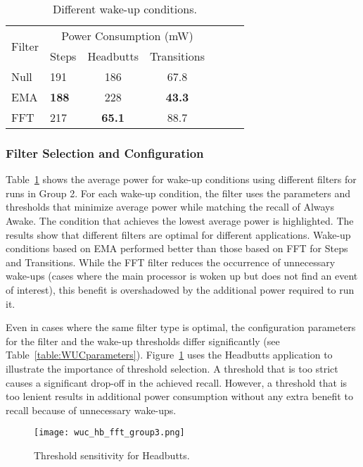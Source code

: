 \begin{table}[t]
\centering
{\small
    \begin{tabular}{|l|l|c|c|c|c|c|}
	\hline
    \multirow{2}{*}{Filter}    	& \multicolumn{3}{c|}{Power Consumption (mW)} \\ \cline{2-4}
							& Steps	& Headbutts	& Transitions 	\\ \hline
    Null     				& 191		& 186		& 67.8 			\\ \hline
	EMA   				& {\bf 188}		& 228		& {\bf 43.3} 			\\ \hline
	FFT 				& 217		& {\bf 65.1} 		& 88.7 			\\ \hline
	
    \end{tabular}
}
	\caption{Different wake-up conditions.}
	\label{table:WUCfilters}
\end{table}

\subsubsection{Filter Selection and Configuration}

Table~\ref{table:WUCfilters} shows the average power for wake-up
conditions using different filters for runs in Group 2.  For each
wake-up condition, the filter uses the parameters and thresholds that
minimize average power while matching the recall of Always Awake.  The
condition that achieves the lowest average power is highlighted.  The
results show that different filters are optimal for different
applications.  Wake-up conditions based on EMA performed better than
those based on FFT for Steps and Transitions.  While the FFT filter
reduces the occurrence of unnecessary wake-ups (cases where
the main processor is woken up but does not find an event of
interest), this benefit is overshadowed by the additional power
required to run it.

Even in cases where the same filter type is optimal, the configuration
parameters for the filter and the wake-up thresholds differ
significantly (see Table~\ref{table:WUCparameters}).
Figure~\ref{fig:wucHeadbuttFFTRecallPowerGroup3} uses the Headbutts
application to illustrate the importance of threshold selection.  A
threshold that is too strict causes a significant drop-off in the
achieved recall.  However, a threshold that is too lenient results in
additional power consumption without any extra benefit to recall
because of unnecessary wake-ups.


\begin{figure}[h]
	\texttt{[image: wuc\_hb\_fft\_group3.png]}
	\caption{Threshold sensitivity for Headbutts.}
    \label{fig:wucHeadbuttFFTRecallPowerGroup3}
\end{figure}




